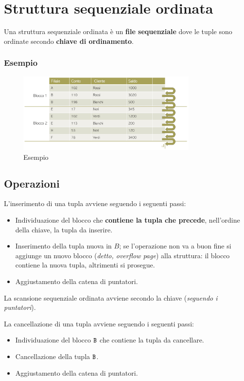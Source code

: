 \documentclass[oneside,a4paper,11pt]{book}
\theoremstyle{italicstyle}
\theoremstyle{normStyle}
\begin{document}
\section{Struttura sequenziale ordinata}
Una struttura sequenziale ordinata è un \textbf{file sequenziale}  dove 
le tuple sono ordinate secondo \textbf{chiave di ordinamento}.
\subsubsection{Esempio}
\begin{figure}[H]
    \centering
    \includegraphics[width=9cm]{img/esempio_index.jpeg}
    \caption{Esempio}
    \label{fig:Es_index}
\end{figure}
\subsection{Operazioni}
L'inserimento di una tupla avviene seguendo i seguenti passi:
\begin{itemize}
    \item Individuazione del blocco che \textbf{contiene la tupla che precede},
    nell'ordine della chiave, la tupla da inserire.
    \item Inserimento della tupla nuova in $B$; se l'operazione non va a buon fine 
    si aggiunge un nuovo blocco (\textit{detto, overflow page}) alla struttura: 
    il blocco contiene la nuova tupla, altrimenti si prosegue.
    \item Aggiustamento della catena di puntatori.
\end{itemize}

La scansione sequenziale ordinata avviene secondo la chiave (\textit{seguendo 
i puntatori}).

La cancellazione di una tupla avviene seguendo i seguenti passi:
\begin{itemize}
    \item Individuazione del blocco $\verb|B|$ che contiene la tupla da cancellare.
    \item Cancellazione della tupla $\verb|B|$.
    \item Aggiustamento della catena di puntatori.
\end{itemize}
\end{document}
